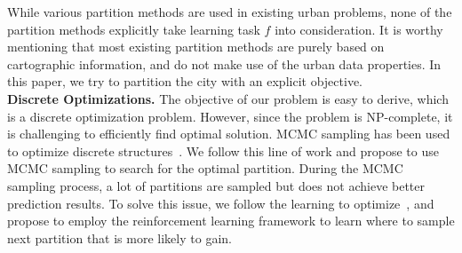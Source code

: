While various partition methods are used in existing urban problems, none of the partition methods explicitly take learning task $f$ into consideration. It is worthy mentioning that most existing partition methods are purely based on cartographic information, and do not make use of the urban data properties. In this paper, we try to partition the city with an explicit objective.\\



\noindent\textbf{Discrete Optimizations.} The objective of our problem is easy to derive, which is a discrete optimization problem. However, since the problem is NP-complete, it is challenging to efficiently find optimal solution. MCMC sampling has been used to optimize discrete structures~\cite{strens2003evolutionary}. We follow this line of work and propose to use MCMC sampling to search for the optimal partition. During the MCMC sampling process, a lot of partitions are sampled but does not achieve better prediction results. To solve this issue, we follow the learning to optimize~\cite{li2016learning}, and propose to employ the reinforcement learning framework to learn where to sample next partition that is more likely to gain.
